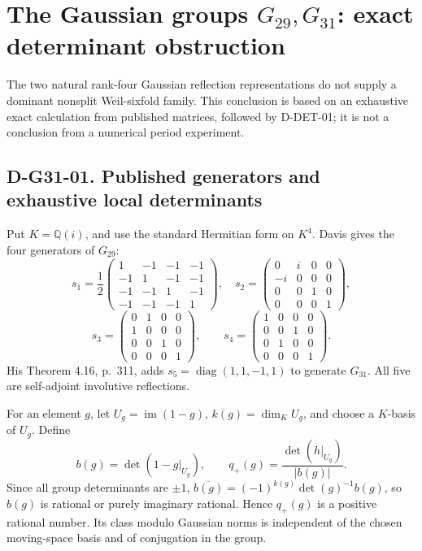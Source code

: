 \section{The Gaussian groups \(G_{29},G_{31}\): exact determinant obstruction}
\label{sec:g31-barrier}

The two natural rank-four Gaussian reflection representations do not
supply a dominant nonsplit Weil-sixfold family. This conclusion is based
on an exhaustive exact calculation from published matrices, followed by
D-DET-01; it is not a conclusion from a numerical period experiment.

\subsection*{D-G31-01. Published generators and exhaustive local determinants}

Put \(K=\mathbb Q(i)\), and use the standard Hermitian form on \(K^4\).
Davis \cite[Theorem 4.1, proof, p.~307]{G34:Davis} gives the four
generators of \(G_{29}\):
\[
s_1=\frac12\begin{pmatrix}
1&-1&-1&-1\\-1&1&-1&-1\\-1&-1&1&-1\\-1&-1&-1&1
\end{pmatrix},\quad
s_2=\begin{pmatrix}0&i&0&0\\-i&0&0&0\\0&0&1&0\\0&0&0&1\end{pmatrix},
\]
\[
s_3=\begin{pmatrix}0&1&0&0\\1&0&0&0\\0&0&1&0\\0&0&0&1\end{pmatrix},\qquad
s_4=\begin{pmatrix}1&0&0&0\\0&0&1&0\\0&1&0&0\\0&0&0&1\end{pmatrix}.
\]
His Theorem 4.16, p.~311, adds
\(s_5=\operatorname{diag}(1,1,-1,1)\) to generate \(G_{31}\).
All five are self-adjoint involutive reflections.

For an element \(g\), let \(U_g=\operatorname{im}(1-g)\),
\(k(g)=\dim_KU_g\), and choose a \(K\)-basis of \(U_g\). Define
\[
b(g)=\det(1-g|_{U_g}),\qquad
q_+(g)=\frac{\det(h|_{U_g})}{|b(g)|}.
\]
Since all group determinants are \(\pm1\),
\(\overline{b(g)}=(-1)^{k(g)}\det(g)^{-1}b(g)\), so \(b(g)\)
is rational or purely imaginary rational. Hence \(q_+(g)\) is a
positive rational number. Its class modulo Gaussian norms is independent
of the chosen moving-space basis and of conjugation in the group.

